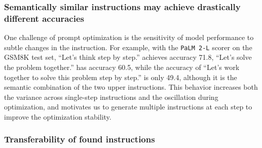\subsubsection{Semantically similar instructions may achieve drastically different accuracies}
\label{sec:ins-acc-variance}
One challenge of prompt optimization is the sensitivity of model performance to subtle changes in the instruction. 
For example, with the \texttt{PaLM 2-L} scorer on the GSM8K test set, ``Let's think step by step.'' achieves accuracy 71.8, ``Let's solve the problem together.'' has accuracy 60.5, while the accuracy of ``Let's work together to solve this problem step by step.'' is only 49.4, although it is the semantic combination of the two upper instructions.
This behavior increases both the variance across single-step instructions and the oscillation during optimization, and motivates us to generate multiple instructions at each step to improve the optimization stability.

\subsubsection{Transferability of found instructions}

